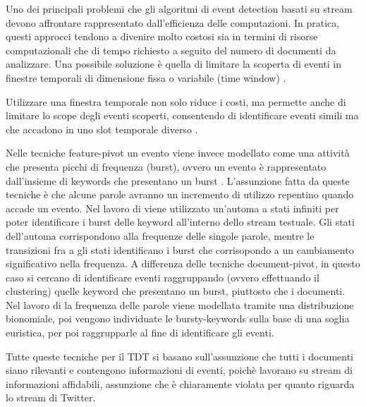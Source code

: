 Uno dei principali problemi che gli algoritmi di event detection basati su stream devono affrontare rappresentato dall'efficienza delle computazioni. In pratica, questi approcci tendono a divenire molto costosi sia in termini di risorse computazionali che di tempo richiesto a seguito del numero di documenti da analizzare.
Una possibile soluzione è quella di limitare la scoperta di eventi in finestre temporali di dimensione fissa o variabile (time window)
\cite{Luo:2007:RRN:1247480.1247536,Papka:1999:ONE:897559}. %

Utilizzare una finestra temporale non solo riduce i costi, ma permette anche di limitare lo scope degli eventi scoperti, consentendo di identificare eventi simili ma che accadono in uno slot temporale diverso \cite{Yang:1998:SRO:290941.290953}. 



Nelle tecniche feature-pivot un evento viene invece modellato come una attività che presenta picchi di frequenza (burst), ovvero un evento è rappresentato dall'insieme di keywords che presentano un burst \cite{Allan:2002:TDT:772260}. L'assunzione fatta da queste tecniche è che alcune parole avranno un incremento di utilizzo repentino quando accade un evento. Nel lavoro di \cite{Kleinberg:2002:BHS:775047.775061} viene utilizzato un'automa a stati infiniti per poter identificare i burst delle keyword all'interno dello stream testuale. Gli stati dell'automa corrispondono alla frequenze delle singole parole, mentre le transizioni fra a gli stati identificano i burst che corrisopondo a un  cambiamento significativo nella frequenza.
A differenza delle tecniche document-pivot, in questo caso si cercano di identificare eventi raggruppando (ovvero effettuando il clustering)   quelle keyword che presentano un burst, piuttosto che i documenti. Nel lavoro di \cite{Allan:2002:TDT:772260} la frequenza delle parole viene modellata tramite una distribuzione bionomiale, poi vengono individuate le bursty-keywords sulla base di una soglia euristica, per poi raggrupparle al fine di identificare gli eventi.

Tutte queste tecniche per il TDT si basano sull'assunzione che tutti i documenti siano rilevanti e contengono informazioni di eventi, poichè lavorano su stream di informazioni affidabili,  assunzione che è chiaramente violata  per quanto riguarda lo stream di Twitter.

